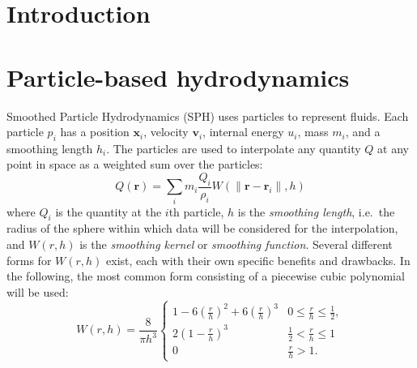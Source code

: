 \documentclass{sig-alternate-05-2015}
\begin{document}



\section{Introduction}


\section{Particle-based hydrodynamics}

Smoothed Particle Hydrodynamics \cite{Gingold1977,Price2012} (SPH) uses
particles to represent fluids.  Each particle $p_i$ has a position $\mathbf
x_i$, velocity $\mathbf v_i$, internal energy $u_i$, mass $m_i$, and a smoothing
length $h_i$.  The particles are used to interpolate any quantity $Q$ at any
point in space as a weighted sum over the particles:
%
\begin{equation}
    Q(\mathbf r) = \sum_i m_i \frac{Q_i}{\rho_i} W( \|\mathbf r - \mathbf r_i\| , h )
    \label{eqn:interp}
\end{equation}
%
where $Q_i$ is the quantity at the $i$th particle, $h$ is the {\em smoothing
  length}, i.e.~the radius of the sphere within which data will be considered
for the interpolation, and $W(r,h)$ is the {\em smoothing kernel} or {\em
  smoothing function}.  Several different forms for $W(r,h)$ exist, each with
their own specific benefits and drawbacks.  In the following, the most common
form consisting of a piecewise cubic polynomial will be used:
%
\begin{equation*}
    W(r,h) = \frac{8}{\pi h^3} \left\{
        \begin{array}{ll}
            1 - 6\left(\frac{r}{h}\right)^2 + 6\left(\frac{r}{h}\right)^3 & 0 \leq \frac{r}{h} \leq \frac{1}{2}, \\
            2\left( 1 - \frac{r}{h} \right)^3 & \frac{1}{2} < \frac{r}{h} \leq 1 \\
            0 & \frac{r}{h} > 1.
        \end{array}\right.
\end{equation*}
\end{document}
